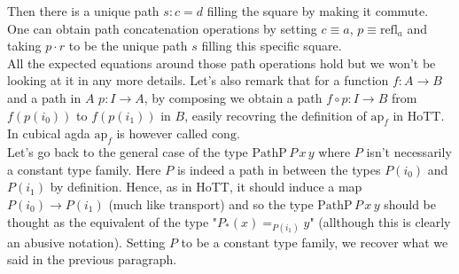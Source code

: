 \documentclass{report}
\begin{document}
\begin{center}
\end{center}
Then there is a unique path $s : c = d$ filling the square by making it commute. One can obtain path concatenation operations by setting $c \equiv a$, $p \equiv \mathrm{refl}_a$ and taking $p \cdot r$ to be the unique path $s$ filling this specific square.\\
All the expected equations around those path operations hold but we won't be looking at it in any more details. Let's also remark that for a function $f : A \rightarrow B$ and a path in $A$ $p: I \rightarrow A$, by composing we obtain a path $f \circ p : I \rightarrow B$ from $f(p(i_0))$ to $f(p(i_1))$ in $B$, easily recovring the definition of $\mathrm{ap}_f$ in HoTT. In cubical agda $\mathrm{ap}_f$ is however called $\mathrm{cong}$. \\
Let's go back to the general case of the type $\mathrm{PathP} \hspace{2pt} P \hspace{2pt} x \hspace{2pt} y$ where $P$ isn't necessarily a constant type family. Here $P$ is indeed a path in between the types $P(i_0)$ and $P(i_1)$ by definition. Hence, as in HoTT, it should induce a map $P(i_0) \rightarrow P(i_1)$ (much like transport) and so the type $\mathrm{PathP} \hspace{2pt} P \hspace{2pt} x \hspace{2pt} y$ should be thought as the equivalent of the type "$P_*(x)=_{P(i_1)} y$" (allthough this is clearly an abusive notation). Setting $P$ to be a constant type family, we recover what we said in the previous paragraph.
\end{document}

